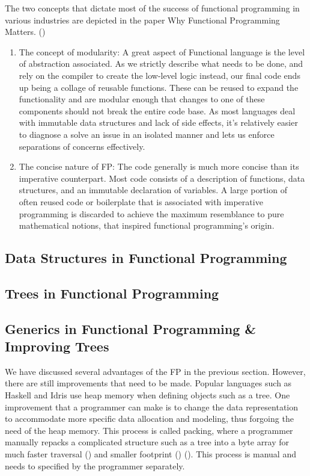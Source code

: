The two concepts that dictate most of the success of functional programming in various industries are depicted in the paper Why Functional Programming Matters. (\textcite{hughes1989functional})
\begin{enumerate}
  \item The concept of modularity: 
        A great aspect of Functional language is the level of abstraction associated. As we strictly describe what needs to be done, and rely on the compiler to create the low-level logic instead, our final code ends up being a collage of reusable functions. These can be reused to expand the functionality and are modular enough that changes to one of these components should not break the entire code base. As most languages deal with immutable data structures and lack of side effects, it's relatively easier to diagnose a solve an issue in an isolated manner and lets us enforce separations of concerns effectively.
  \item The concise nature of FP:
        The code generally is much more concise than its imperative counterpart. Most code consists of a description of functions, data structures, and an immutable declaration of variables. A large portion of often reused code or boilerplate that is associated with imperative programming is discarded to achieve the maximum resemblance to pure mathematical notions, that inspired functional programming's origin. 
\end{enumerate}

\subsection{Data Structures in Functional Programming}
\subsection{Trees in Functional Programming}
\subsection{Generics in Functional Programming & Improving Trees}

We have discussed several advantages of the FP in the previous section. However, there are still improvements that need to be made. Popular languages such as Haskell and Idris use heap memory when defining objects such as a tree. One improvement that a programmer can make is to change the data representation to accommodate more specific data allocation and modeling, thus forgoing the need of the heap memory. This process is called packing, where a programmer manually repacks a complicated structure such as a tree into a byte array for much faster traversal (\textcite{goldfarb2013general}) and smaller footprint (\textcite{makino1990vectorization}) (\textcite{meyerovich2011data}). This process is manual and needs to specified by the programmer separately. 

